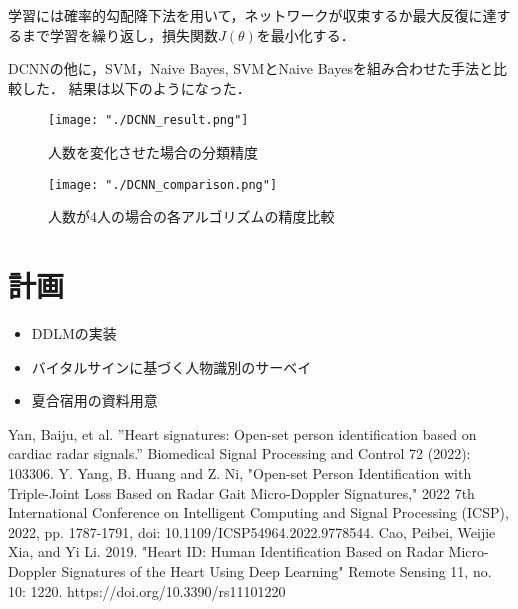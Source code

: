\documentclass[a4j, dvipdfmx]{jsarticle}
\begin{document}
学習には確率的勾配降下法を用いて，ネットワークが収束するか最大反復に達するまで学習を繰り返し，損失関数$J (\theta)$を最小化する．

DCNNの他に，SVM，Naive Bayes, SVMとNaive Bayesを組み合わせた手法と比較した．
結果は以下のようになった．

\begin{figure}[H]\centering
\texttt{[image: "./DCNN\_result.png"]}
\caption{人数を変化させた場合の分類精度}
\vspace{0zh}
\end{figure}

\begin{figure}[H]\centering
\caption{人数が4人の場合の各アルゴリズムの精度比較}
\texttt{[image: "./DCNN\_comparison.png"]}
\vspace{0zh}
\end{figure}

\section{計画}
\begin{itemize}
    \item DDLMの実装
    \item バイタルサインに基づく人物識別のサーベイ
    \item 夏合宿用の資料用意
\end{itemize}

\begin{thebibliography}{99}
     Yan, Baiju, et al. ”Heart signatures: Open-set person identification based on cardiac radar signals.” Biomedical Signal Processing and Control 72 (2022): 103306.
     Y. Yang, B. Huang and Z. Ni, "Open-set Person Identification with Triple-Joint Loss Based on Radar Gait Micro-Doppler Signatures," 2022 7th International Conference on Intelligent Computing and Signal Processing (ICSP), 2022, pp. 1787-1791, doi: 10.1109/ICSP54964.2022.9778544.
     Cao, Peibei, Weijie Xia, and Yi Li. 2019. "Heart ID: Human Identification Based on Radar Micro-Doppler Signatures of the Heart Using Deep Learning" Remote Sensing 11, no. 10: 1220. https://doi.org/10.3390/rs11101220
\end{thebibliography}
\end{document}
